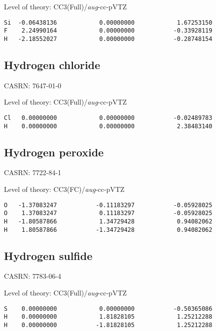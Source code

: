 \documentclass[journal=jctcce,manuscript=article,layout=traditional]{achemso}
\newcommand{\AVTZ}{\emph{aug}-cc-pVTZ}
\begin{document}
\begin{singlespace}
\noindent  Level of theory: CC3(Full)/{\AVTZ}
\begin{verbatim}
Si  -0.06438136            0.00000000            1.67253150
F    2.24990164            0.00000000           -0.33928119
H   -2.18552027            0.00000000           -0.28748154
\end{verbatim}
\end{singlespace}

\subsection{Hydrogen chloride}

CASRN: 7647-01-0

\begin{singlespace}
\noindent Level of theory: CC3(Full)/{\AVTZ}
\begin{verbatim}
Cl   0.00000000            0.00000000           -0.02489783
H    0.00000000            0.00000000            2.38483140
\end{verbatim}
\end{singlespace}

\subsection{Hydrogen peroxide}

CASRN: 7722-84-1

\begin{singlespace}
\noindent Level of theory: CC3(FC)/{\AVTZ}
\begin{verbatim}
O   -1.37083247           -0.11183297           -0.05928025
O    1.37083247            0.11183297           -0.05928025
H   -1.80587866            1.34729428            0.94082062
H    1.80587866           -1.34729428            0.94082062
\end{verbatim}
\end{singlespace}

\subsection{Hydrogen sulfide}

CASRN: 7783-06-4

\begin{singlespace}
\noindent Level of theory: CC3(Full)/{\AVTZ}
\begin{verbatim}
S    0.00000000            0.00000000           -0.50365086
H    0.00000000            1.81828105            1.25212288
H    0.00000000           -1.81828105            1.25212288
\end{verbatim}
\end{singlespace}
\end{document}
